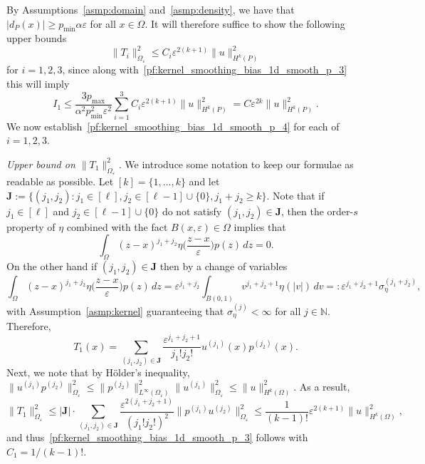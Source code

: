\documentclass{article}
\newcommand{\1}{\mathbf{1}}
\theoremstyle{definition}
\theoremstyle{remark}
\begin{document}
By Assumptions~\ref{asmp:domain} and~\ref{asmp:density}, we have that $|d_P(x)| \geq p_{\min} \alpha\varepsilon$ for all $x \in \Omega$. It will therefore suffice to show the following upper bounds
\begin{equation}
\label{pf:kernel_smoothing_bias_1d_smooth_p_4}
\|T_i\|_{\Omega_{\varepsilon}}^2 \leq C_i \varepsilon^{2(k + 1)} \|u\|_{H^{k}(P)}^2
\end{equation}
for $i = 1,2,3$, since along with~\eqref{pf:kernel_smoothing_bias_1d_smooth_p_3} this will imply
\begin{equation*}
I_1 \leq \frac{3p_{\max}}{\alpha^2 p_{\min}^2 \varepsilon^2} \sum_{i = 1}^{3} C_i \varepsilon^{2(k + 1)} \|u\|_{H^{k}(P)}^2 = C \varepsilon^{2k} \|u\|_{H^k(P)}^2.
\end{equation*}
We now establish~\eqref{pf:kernel_smoothing_bias_1d_smooth_p_4} for each of $i = 1,2,3$.

\textit{Upper bound on $\|T_1\|_{\Omega_{\varepsilon}}^2$.}
We introduce some notation to keep our formulae as readable as possible. Let $[k] = \{1,\ldots,k\}$ and let $\mathbf{J} := \bigl\{(j_1,j_2): j_1 \in [\ell], j_2 \in [\ell - 1] \cup \{0\}, j_1 + j_2 \geq k\bigr\}$. Note that if $j_1 \in [\ell]$ and $j_2 \in [\ell - 1] \cup \{0\}$ do not satisfy $(j_1,j_2) \in \mathbf{J}$, then the order-$s$ property of $\eta$ combined with the fact $B(x,\varepsilon) \in \Omega$ implies that
\begin{equation*}
\int_{\Omega} (z - x)^{j_1 + j_2} \eta\biggl(\frac{z - x}{\varepsilon}\biggr) p(z) \,dz = 0.
\end{equation*}
On the other hand if $(j_1,j_2) \in \mathbf{J}$ then by a change of variables
\begin{equation*}
\int_{\Omega} (z - x)^{j_1 + j_2} \eta\biggl(\frac{z - x}{\varepsilon}\biggr) p(z) \,dz = \varepsilon^{j_1 + j_2} \int_{B(0,1)} v^{j_1 + j_2 + 1} \eta(|v|) \,dv =: \varepsilon^{j_1 + j_2 + 1} \sigma_\eta^{(j_1 + j_2)},
\end{equation*}
with Assumption~\ref{asmp:kernel} guaranteeing that $\sigma_\eta^{(j)} < \infty$ for all $j \in \mathbb{N}$. Therefore,
\begin{equation*}
T_1(x) = \sum_{(j_1,j_2) \in \mathbf{J}} \frac{\varepsilon^{j_1 + j_2 + 1}}{j_1!j_2!} u^{(j_1)}(x) p^{(j_2)}(x) .
\end{equation*}
Next, we note that by H\"{o}lder's inequality, $\|u^{(j_1)} p^{(j_2)} \|_{\Omega_{\varepsilon}}^2 \leq  \|p^{(j_2)}\|_{L^{\infty}(\Omega_{\varepsilon})}^2 \|u^{(j_1)}\|_{\Omega_{\varepsilon}}^2 \leq \|u\|_{H^k(\Omega)}^2$. As a result,
\begin{equation*}
\|T_1\|_{\Omega_{\varepsilon}}^2 \leq |\mathbf{J}| \cdot \sum_{(j_1,j_2) \in \mathbf{J}} \frac{\varepsilon^{2(j_1 + j_2 + 1)}}{(j_1!j_2!)^2} \|p^{(j_1)}  u^{(j_2)}\|_{\Omega_{\varepsilon}}^2 \leq \frac{1}{(k - 1)!} \varepsilon^{2(k + 1)} \|u\|_{H^k(\Omega)}^2,
\end{equation*}
and thus~\eqref{pf:kernel_smoothing_bias_1d_smooth_p_3} follows with $C_1 = 1/(k - 1)!$. 
\end{document}
